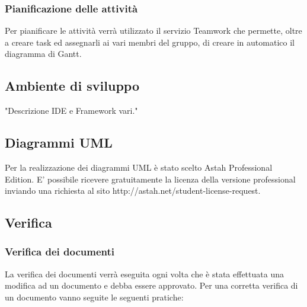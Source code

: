 \subsubsection{Pianificazione delle attività}

Per pianificare le attività verrà utilizzato il servizio Teamwork che permette, oltre a creare task ed assegnarli ai vari membri del gruppo, di creare in automatico il diagramma di Gantt.

\subsection{Ambiente di sviluppo}

"Descrizione IDE e Framework vari."

\subsection{Diagrammi UML}

Per la realizzazione dei diagrammi UML è stato scelto Astah Professional Edition.
E' possibile ricevere gratuitamente la licenza della versione professional inviando una richiesta al sito http://astah.net/student-license-request.

\subsection{Verifica}

\subsubsection{Verifica dei documenti}

La verifica dei documenti verrà eseguita ogni volta che è stata effettuata una modifica ad un documento e debba essere approvato.
Per una corretta verifica di un documento vanno seguite le seguenti pratiche:


